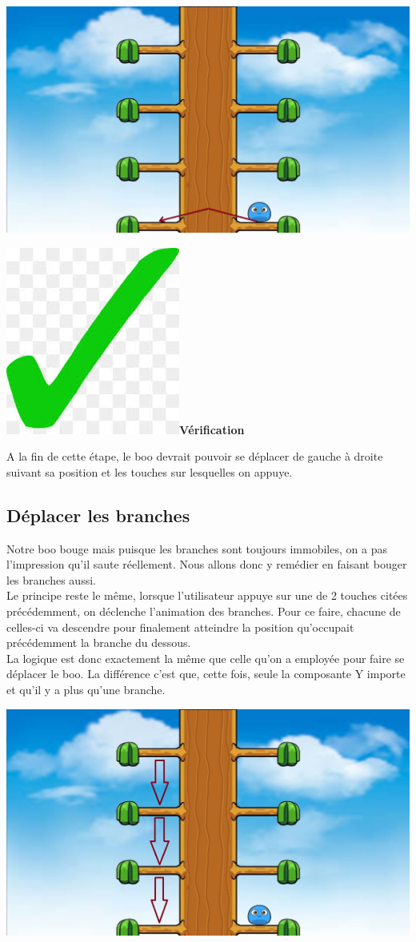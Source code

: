 \documentclass[french]{article}
\newcommand{\result}{\includegraphics[scale=0.1]{green_tick}\textbf{Vérification\\}}
\begin{document}
\begin{center}
	\includegraphics[scale=0.20]{step3-3}
\end{center}

\newpage

\result

A la fin de cette étape, le boo devrait pouvoir se déplacer de gauche à droite suivant sa position et les touches sur lesquelles on appuye.

\subsection{Déplacer les branches}

Notre boo bouge mais puisque les branches sont toujours immobiles, on a pas l'impression qu'il saute réellement. Nous allons donc y remédier en faisant bouger les branches aussi.\\

Le principe reste le même, lorsque l'utilisateur appuye sur une de 2 touches citées précédemment, on déclenche l'animation des branches. Pour ce faire, chacune de celles-ci va descendre pour finalement atteindre la position qu'occupait précédemment la branche du dessous.\\

La logique est donc exactement la même que celle qu'on a employée pour faire se déplacer le boo. La différence c'est que, cette fois, seule la composante Y importe et qu'il y a plus qu'une branche.

\begin{center}
	\includegraphics[scale=0.20]{step4-1}
\end{center}
\end{document}
